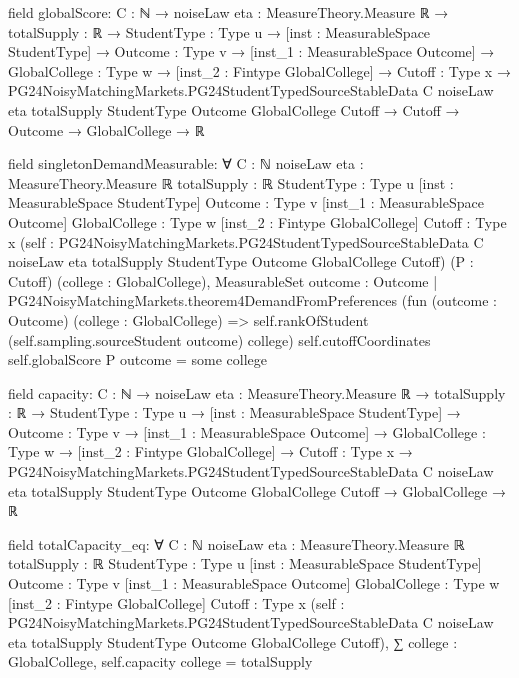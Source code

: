 \documentclass[10pt]{article}
\begin{document}
\begin{ReviewVerbatim}
field globalScore:
{C : ℕ} →
  {noiseLaw eta : MeasureTheory.Measure ℝ} →
    {totalSupply : ℝ} →
      {StudentType : Type u} →
        [inst : MeasurableSpace StudentType] →
          {Outcome : Type v} →
            [inst_1 : MeasurableSpace Outcome] →
              {GlobalCollege : Type w} →
                [inst_2 : Fintype GlobalCollege] →
                  {Cutoff : Type x} →
                    PG24NoisyMatchingMarkets.PG24StudentTypedSourceStableData C noiseLaw eta totalSupply StudentType
                        Outcome GlobalCollege Cutoff →
                      Cutoff → Outcome → GlobalCollege → ℝ

field singletonDemandMeasurable:
∀ {C : ℕ} {noiseLaw eta : MeasureTheory.Measure ℝ} {totalSupply : ℝ} {StudentType : Type u}
  [inst : MeasurableSpace StudentType] {Outcome : Type v} [inst_1 : MeasurableSpace Outcome] {GlobalCollege : Type w}
  [inst_2 : Fintype GlobalCollege] {Cutoff : Type x}
  (self :
    PG24NoisyMatchingMarkets.PG24StudentTypedSourceStableData C noiseLaw eta totalSupply StudentType Outcome
      GlobalCollege Cutoff)
  (P : Cutoff) (college : GlobalCollege),
  MeasurableSet
    {outcome : Outcome |
      PG24NoisyMatchingMarkets.theorem4DemandFromPreferences
          (fun (outcome : Outcome) (college : GlobalCollege) =>
            self.rankOfStudent (self.sampling.sourceStudent outcome) college)
          self.cutoffCoordinates self.globalScore P outcome =
        some college}

field capacity:
{C : ℕ} →
  {noiseLaw eta : MeasureTheory.Measure ℝ} →
    {totalSupply : ℝ} →
      {StudentType : Type u} →
        [inst : MeasurableSpace StudentType] →
          {Outcome : Type v} →
            [inst_1 : MeasurableSpace Outcome] →
              {GlobalCollege : Type w} →
                [inst_2 : Fintype GlobalCollege] →
                  {Cutoff : Type x} →
                    PG24NoisyMatchingMarkets.PG24StudentTypedSourceStableData C noiseLaw eta totalSupply StudentType
                        Outcome GlobalCollege Cutoff →
                      GlobalCollege → ℝ

field totalCapacity_eq:
∀ {C : ℕ} {noiseLaw eta : MeasureTheory.Measure ℝ} {totalSupply : ℝ} {StudentType : Type u}
  [inst : MeasurableSpace StudentType] {Outcome : Type v} [inst_1 : MeasurableSpace Outcome] {GlobalCollege : Type w}
  [inst_2 : Fintype GlobalCollege] {Cutoff : Type x}
  (self :
    PG24NoisyMatchingMarkets.PG24StudentTypedSourceStableData C noiseLaw eta totalSupply StudentType Outcome
      GlobalCollege Cutoff),
  ∑ college : GlobalCollege, self.capacity college = totalSupply


\end{ReviewVerbatim}
\end{document}
